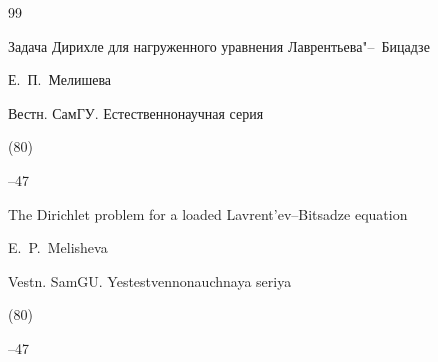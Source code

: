 \begin{thebibliography}{99}

\paper Задача Дирихле для нагруженного уравнения Лаврентьева"--~Бицадзе

\by Е.~П.~Мелишева

\jour Вестн. СамГУ. Естественнонаучная серия


(80)

--47

\misctransl

\paper The Dirichlet problem for a loaded Lavrent'ev--Bitsadze equation

\by E.~P.~Melisheva

\jour Vestn. SamGU. Yestestvennonauchnaya seriya 


(80) 

--47





\end{thebibliography}



\noindent

\hskip6.5cm \thedate \par\noindent

\hskip6.5cm\therevdate

%

%

%




\makeengtitlem







\newpage

%


%

%

